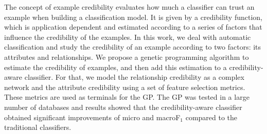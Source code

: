 The concept of example credibility evaluates how much a classifier can trust an example when building a classification model.
It is given by a credibility function, which is application dependent and estimated according to a series of factors that influence the credibility of the examples.
In this work, we deal with automatic classification and study the credibility of an example according to two factors: its attributes and relationships. 
We propose a genetic programming algorithm to estimate the credibility of examples, and then add this estimation to a credibility-aware classifier. 
For that, we model the relationship credibility as a complex network and the attribute credibility using a set of feature selection metrics. These metrics are used as terminals for the GP. The GP was tested in a large number of databases and results showed that the credibility-aware classifier obtained significant improvements of micro and macroF$_1$ compared to the traditional classifiers.


